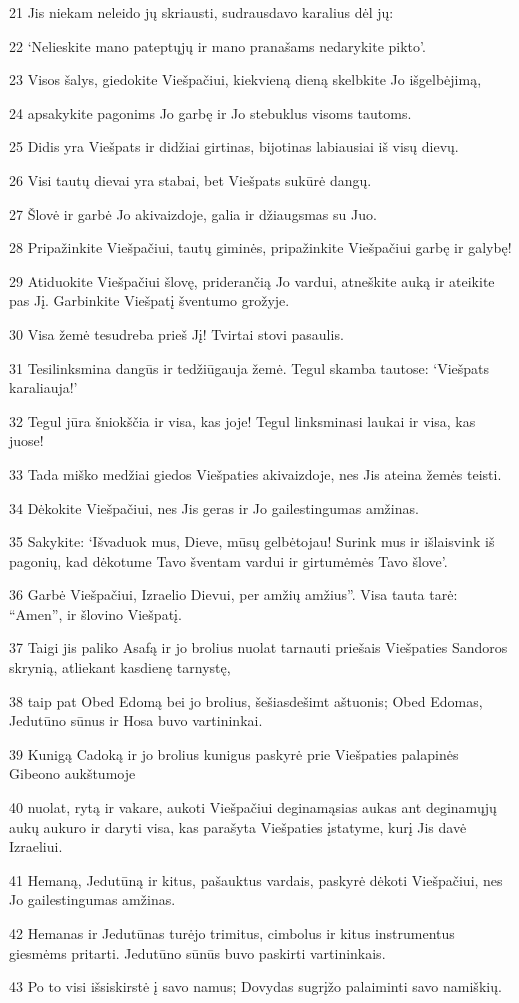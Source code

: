 \par 21 Jis niekam neleido jų skriausti, sudrausdavo karalius dėl jų: 
\par 22 ‘Nelieskite mano pateptųjų ir mano pranašams nedarykite pikto’. 
\par 23 Visos šalys, giedokite Viešpačiui, kiekvieną dieną skelbkite Jo išgelbėjimą, 
\par 24 apsakykite pagonims Jo garbę ir Jo stebuklus visoms tautoms. 
\par 25 Didis yra Viešpats ir didžiai girtinas, bijotinas labiausiai iš visų dievų. 
\par 26 Visi tautų dievai yra stabai, bet Viešpats sukūrė dangų. 
\par 27 Šlovė ir garbė Jo akivaizdoje, galia ir džiaugsmas su Juo. 
\par 28 Pripažinkite Viešpačiui, tautų giminės, pripažinkite Viešpačiui garbę ir galybę! 
\par 29 Atiduokite Viešpačiui šlovę, priderančią Jo vardui, atneškite auką ir ateikite pas Jį. Garbinkite Viešpatį šventumo grožyje. 
\par 30 Visa žemė tesudreba prieš Jį! Tvirtai stovi pasaulis. 
\par 31 Tesilinksmina dangūs ir tedžiūgauja žemė. Tegul skamba tautose: ‘Viešpats karaliauja!’ 
\par 32 Tegul jūra šniokščia ir visa, kas joje! Tegul linksminasi laukai ir visa, kas juose! 
\par 33 Tada miško medžiai giedos Viešpaties akivaizdoje, nes Jis ateina žemės teisti. 
\par 34 Dėkokite Viešpačiui, nes Jis geras ir Jo gailestingumas amžinas. 
\par 35 Sakykite: ‘Išvaduok mus, Dieve, mūsų gelbėtojau! Surink mus ir išlaisvink iš pagonių, kad dėkotume Tavo šventam vardui ir girtumėmės Tavo šlove’. 
\par 36 Garbė Viešpačiui, Izraelio Dievui, per amžių amžius”. Visa tauta tarė: “Amen”, ir šlovino Viešpatį. 
\par 37 Taigi jis paliko Asafą ir jo brolius nuolat tarnauti priešais Viešpaties Sandoros skrynią, atliekant kasdienę tarnystę, 
\par 38 taip pat Obed Edomą bei jo brolius, šešiasdešimt aštuonis; Obed Edomas, Jedutūno sūnus ir Hosa buvo vartininkai. 
\par 39 Kunigą Cadoką ir jo brolius kunigus paskyrė prie Viešpaties palapinės Gibeono aukštumoje 
\par 40 nuolat, rytą ir vakare, aukoti Viešpačiui deginamąsias aukas ant deginamųjų aukų aukuro ir daryti visa, kas parašyta Viešpaties įstatyme, kurį Jis davė Izraeliui. 
\par 41 Hemaną, Jedutūną ir kitus, pašauktus vardais, paskyrė dėkoti Viešpačiui, nes Jo gailestingumas amžinas. 
\par 42 Hemanas ir Jedutūnas turėjo trimitus, cimbolus ir kitus instrumentus giesmėms pritarti. Jedutūno sūnūs buvo paskirti vartininkais. 
\par 43 Po to visi išsiskirstė į savo namus; Dovydas sugrįžo palaiminti savo namiškių.



